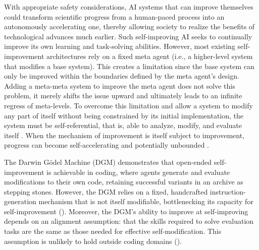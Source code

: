 \documentclass{article}
\begin{document}
With appropriate safety considerations, AI systems that can improve themselves could transform scientific progress from a human-paced process into an autonomously accelerating one, thereby allowing society to realize the benefits of technological advances much earlier. Such self-improving AI seeks to continually improve its own learning and task-solving abilities. However, most existing self-improvement architectures rely on a fixed meta agent (i.e., a higher-level system that modifies a base system). This creates a limitation since the base system can only be improved within the boundaries defined by the meta agent's design. Adding a meta-meta system to improve the meta agent does not solve this problem, it merely shifts the issue upward and ultimately leads to an infinite regress of meta-levels. To overcome this limitation and allow a system to modify any part of itself without being constrained by its initial implementation, the system must be self-referential, that is, able to analyze, modify, and evaluate itself \citep{kirsch2022eliminating, zhang2025darwin}. When the mechanism of improvement is itself subject to improvement, progress can become self-accelerating and potentially unbounded \citep{lu2023arbitrary}.

The Darwin G\"odel Machine (DGM) \citep{zhang2025darwin} demonstrates that open-ended self-improvement is achievable in coding, where agents generate and evaluate modifications to their own code, retaining successful variants in an archive as stepping stones. However, the DGM relies on a fixed, handcrafted instruction-generation mechanism that is not itself modifiable, bottlenecking its capacity for self-improvement (). Moreover, the DGM's ability to improve at self-improving depends on an alignment assumption: that the skills required to solve evaluation tasks are the same as those needed for effective self-modification. This assumption is unlikely to hold outside coding domains ().
\end{document}
